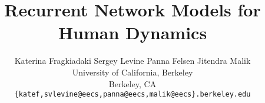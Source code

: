 \documentclass[10pt,twocolumn,letterpaper]{article}
\begin{document}
\title{Recurrent Network Models for Human Dynamics}
\author{Katerina Fragkiadaki \quad \quad Sergey Levine \quad \quad Panna Felsen \quad \quad Jitendra Malik\\
University of California, Berkeley\\
Berkeley, CA \\
{\tt\small \{katef,svlevine@eecs,panna@eecs,malik@eecs\}.berkeley.edu}
}


\maketitle
\newcommand{\mocap}{\theta}
\newcommand{\ea}{\text{\textit{et al.}}}
\newcommand{\z}{\mathrm{z}}
\newcommand{\tr}{\mathrm{tr}}
\newcommand{\mycolor}{gray}
\newcommand{\ntr}{n_T}
\newcommand{\auto}{\text{ERD}}
\newcommand{\ERD}{\text{ERD}}
\newcommand{\data}{x}
\newcommand{\seq}{\mathbf{x}}
\newcommand{\WW}{\mathbf{W}}
\newcommand{\xex}{\mathbf{x}}
\newcommand{\Lo}{\mathcal{L}}
\newcommand{\thetanet}{\boldsymbol \theta}
\newcommand{\LL}{\mathbf{L}}
\newcommand{\clcl}{\mathrm{cl}^2}
\newcommand{\dl}{\mathrm{dl}}
\newcommand{\ov}{s}
\newcommand{\ATsteer}{\W^{\mathrm{steer}}_{T}}

\newcommand{\Csteer}{\C^{\mathrm{steer}}}
\newcommand{\ndl}{n_D}
\newcommand{\np}{n_P}
\newcommand{\salgroup}{\mathrm{ncut}}
\newcommand{\cnfd}{\mathrm{confidence}}
\newcommand{\thresh}{\mathrm{th}}
\newcommand{\dr}{\mathrm{r}}
\newcommand{\dc}{\ce}
\newcommand{\confcf}{\mathbf{confidence}}
\newcommand{\aligncf}{\mathrm{align}}
\newcommand{\AD}{\mathbf{A}_D}
\newcommand{\W}{\mathbf{W}}
\newcommand{\eig}{\mathrm{eig}}
\newcommand{\pbth}{\beta}
\newcommand{\discthresh}{\gamma}
\newcommand{\Asteer}{\W^\mathrm{steer}_T}
\newcommand{\Asteernoh}{\mathbf{A}_\mathbf{steer}}
\newcommand{\Aco}{\mathbf{A}^{\mathrm{c}}}
\newcommand{\RD}{\mathbf{R}_D}
\newcommand{\dlsel}{h}
\newcommand{\RDF}{\mathbf{R}_D^\dlsel}
\newcommand{\R}{\mathcal{R}}
\newcommand{\AT}{\mathbf{A}}
\newcommand{\f}{\mathrm{f}}
\newcommand{\trc}{\mathrm{C}}
\newcommand{\RT}{\mathbf{R}_T}
\newcommand{\Tf}{\mathcal{T}^\mathbf{f}}
\newcommand{\st}{\mathrm{subject \text{ } to}}
\newcommand{\vc}{\mathrm{vec}}
\newcommand{\Wtilde}{\tilde{\mathbf{W}}}
\newcommand{\thr}{\mathrm{th}}
\newcommand{\maxmarg}{\mathrm{mxmr}}
\newcommand{\trd}{\tr^D}
\newcommand{\C}{\mathbf{C}}
\newcommand{\ns}{n_S}
\newcommand{\nss}{m}
\newcommand{\Cg}{\mathbf{C}_G}
\newcommand{\Prob}{\mathrm{P}}
\newcommand{\D}{\mathbf{D}}
\end{document}
